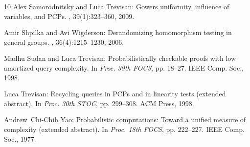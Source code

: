 \documentclass[11pt]{article}
\numberwithin{equation}{section}
\theoremstyle{definition}
\theoremstyle{plain}
\begin{document}
\begin{thebibliography}{10}
{\sc Alex Samorodnitsky and Luca Trevisan}: Gowers uniformity, influence of
  variables, and {PCP}s.
, 39(1):323--360, 2009.
\newblock [\epfmtdoi{10.1137/070681612}]

{\sc Amir Shpilka and Avi Wigderson}: Derandomizing homomorphism testing in
  general groups.
, 36(4):1215--1230, 2006.
\newblock [\epfmtdoi{10.1137/S009753970444658X}]

{\sc Madhu Sudan and Luca Trevisan}: Probabilistically checkable proofs with
  low amortized query complexity.
\newblock In {\em Proc. 39th FOCS}, pp. 18--27. IEEE Comp. Soc., 1998.

{\sc Luca Trevisan}: Recycling queries in {PCP}s and in linearity tests
  (extended abstract).
\newblock In {\em Proc. 30th STOC}, pp. 299--308. ACM Press, 1998.
\newblock [\epfmtdoi{10.1145/276698.276769}]

{\sc Andrew~Chi{-}Chih Yao}: Probabilistic computations: Toward a unified
  measure of complexity (extended abstract).
\newblock In {\em Proc. 18th FOCS}, pp. 222--227. IEEE Comp. Soc., 1977.

\end{thebibliography}
\end{document}
